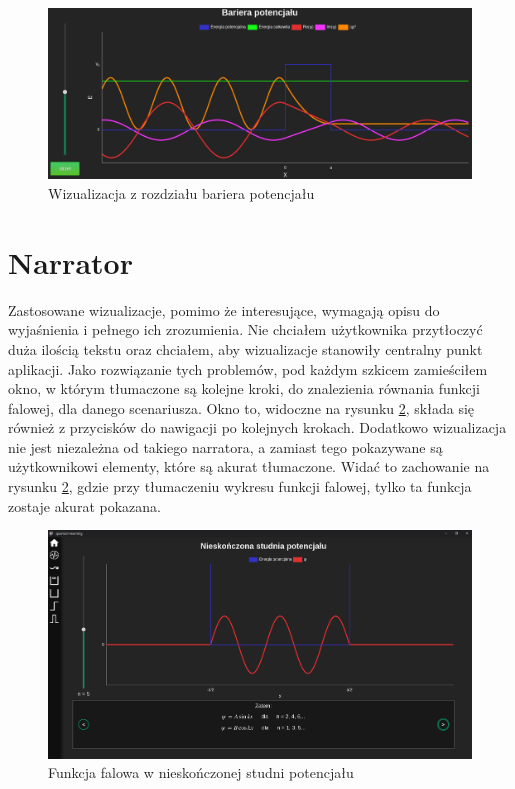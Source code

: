 \documentclass{SGGW-thesis}
\begin{document}
	\begin{figure}[H]
	\includegraphics[width=\textwidth,height=\textheight,keepaspectratio]{barrier.png} 
	\caption{Wizualizacja z rozdziału bariera potencjału}
	\label{fig:potential-barrier}
	\end{figure}
	
	\section{Narrator}
	Zastosowane wizualizacje, pomimo że interesujące, wymagają opisu do wyjaśnienia i pełnego ich zrozumienia. Nie chciałem użytkownika przytłoczyć duża ilością tekstu oraz chciałem, aby wizualizacje stanowiły centralny punkt aplikacji. Jako rozwiązanie tych problemów, pod każdym szkicem zamieściłem okno, w którym tłumaczone są kolejne kroki, do znalezienia równania funkcji falowej, dla danego scenariusza. Okno to, widoczne na rysunku \ref{fig:narrator}, składa się również z przycisków do nawigacji po kolejnych krokach. Dodatkowo wizualizacja nie jest niezależna od takiego narratora, a zamiast tego pokazywane są użytkownikowi elementy, które są akurat tłumaczone. Widać to zachowanie na rysunku \ref{fig:narrator}, gdzie przy tłumaczeniu wykresu funkcji falowej, tylko ta funkcja zostaje akurat pokazana.
	
	\begin{figure}[H]
	\includegraphics[width=\textwidth,height=\textheight,keepaspectratio]{narrator.png} 
	\caption{Funkcja falowa w nieskończonej studni potencjału}
	\label{fig:narrator}
	\end{figure}
	
\end{document}
